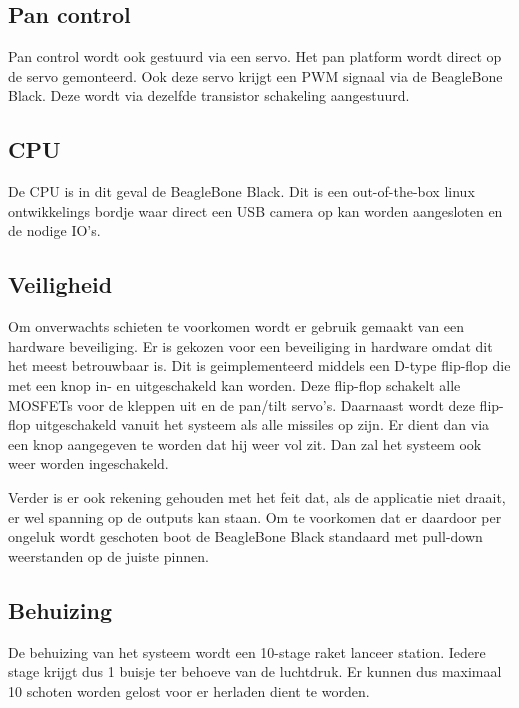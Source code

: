 \begin{cppcode}
\begin{cppcode}
\subsection{Pan control}
\label{sub:panContr}
Pan control wordt ook gestuurd via een servo. Het pan platform wordt direct op de servo 
gemonteerd. Ook deze servo krijgt een PWM signaal via de BeagleBone Black. Deze wordt 
via dezelfde transistor schakeling aangestuurd.

\subsection{CPU}
\label{sub:cpu}
De CPU is in dit geval de BeagleBone Black. Dit is een out-of-the-box linux ontwikkelings 
bordje waar direct een USB camera op kan worden aangesloten en de nodige IO's.

\subsection{Veiligheid}
\label{sub:veiligheid}
Om onverwachts schieten te voorkomen wordt er gebruik gemaakt van een hardware beveiliging. 
Er is gekozen voor een beveiliging in hardware omdat dit het meest betrouwbaar is. Dit is 
geimplementeerd middels een D-type flip-flop die met een knop in- en uitgeschakeld kan 
worden. Deze flip-flop schakelt alle MOSFETs voor de kleppen uit en de pan/tilt servo's. 
Daarnaast wordt deze flip-flop uitgeschakeld vanuit het systeem als alle missiles op zijn. 
Er dient dan via een knop aangegeven te worden dat hij weer vol zit. Dan zal het systeem 
ook weer worden ingeschakeld.

Verder is er ook rekening gehouden met het feit dat, als de applicatie niet draait, er wel 
spanning op de outputs kan staan. Om te voorkomen dat er daardoor per ongeluk wordt geschoten 
boot de BeagleBone Black standaard met pull-down weerstanden op de juiste pinnen.

\subsection{Behuizing}
\label{sub:behuizing}
De behuizing van het systeem wordt een 10-stage raket lanceer station. Iedere stage krijgt dus 1
buisje ter behoeve van de luchtdruk. Er kunnen dus maximaal 10 schoten worden gelost voor er
herladen dient te worden.


\end{cppcode}
\end{cppcode}
